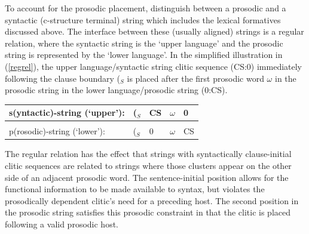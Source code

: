 \documentclass[output=paper,hidelinks]{langscibook}
\begin{document}
\ea\label{modifiedS}
\z

\noindent To account for the prosodic placement, \citet{boegel-etal2010} distinguish between a prosodic and a syntactic (c-structure terminal) string which includes the lexical formatives discussed above. The interface between these (usually aligned) strings is a regular relation, where the syntactic string is the `upper language' and the prosodic string is represented by the `lower language'. In the simplified illustration in (\ref{regrel}), the upper language/syntactic string clitic sequence (CS:0) immediately following the clause boundary ($_S$ is placed after the first prosodic word $\omega$ in the prosodic string  in the lower language/prosodic string (0:CS). 

\ea\label{regrel} 
\begin{tabular}[t]{lllcl}
s(yntactic)-string (`upper'): & ($_S$ & CS & $\omega$ & 0 \\[0.5ex]
\hline
& & & & \\[-2.2ex]
p(rosodic)-string (`lower'): & ($_S$ & 0 & $\omega$ & CS  \\
\end{tabular}
\z


\noindent The regular relation has the effect that strings with syntactically clause-initial clitic sequences are related to strings where those clusters appear on the other side of an adjacent prosodic word. The sentence-initial position allows for the functional information to be made available to syntax, but violates the prosodically dependent clitic's need for a preceding host.
The second position in the prosodic string satisfies this prosodic constraint in that the clitic is placed following a valid prosodic host.
\end{document}
